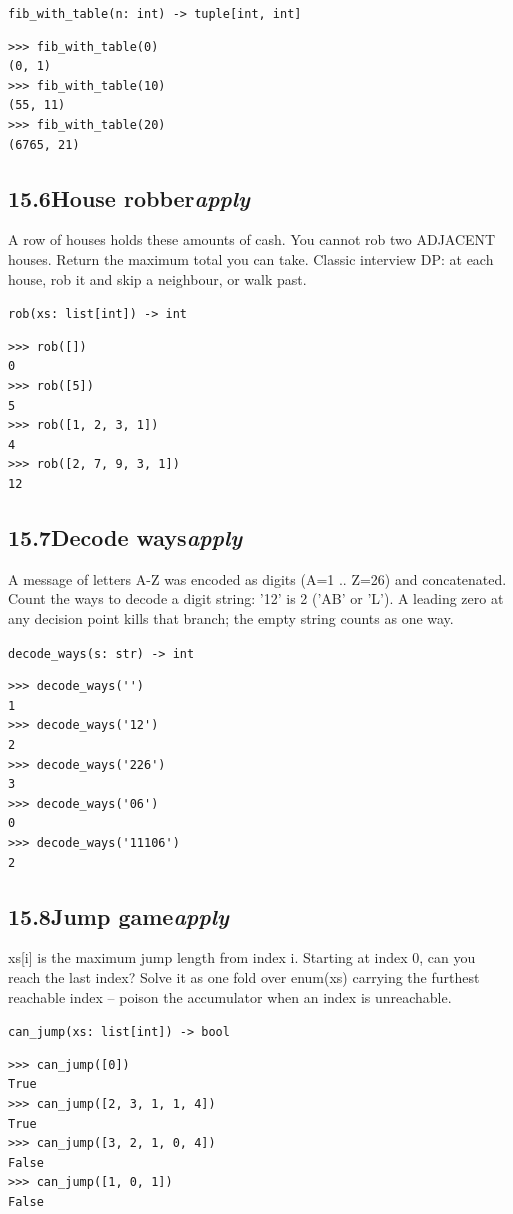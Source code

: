 \documentclass[10pt,letterpaper]{book}
\begin{document}
\noindent\texttt{fib\_with\_table(n: int) -> tuple[int, int]}
\begin{lstlisting}[style=ex]
>>> fib_with_table(0)
(0, 1)
>>> fib_with_table(10)
(55, 11)
>>> fib_with_table(20)
(6765, 21)
\end{lstlisting}
\subsection*{15.6\quad House robber\hfill\textnormal{\textit{apply}}}
A row of houses holds these amounts of cash. You cannot rob two ADJACENT houses. Return the maximum total you can take. Classic interview DP: at each house, rob it and skip a neighbour, or walk past.

\noindent\texttt{rob(xs: list[int]) -> int}
\begin{lstlisting}[style=ex]
>>> rob([])
0
>>> rob([5])
5
>>> rob([1, 2, 3, 1])
4
>>> rob([2, 7, 9, 3, 1])
12
\end{lstlisting}
\subsection*{15.7\quad Decode ways\hfill\textnormal{\textit{apply}}}
A message of letters A-Z was encoded as digits (A=1 .. Z=26) and concatenated. Count the ways to decode a digit string: '12' is 2 ('AB' or 'L'). A leading zero at any decision point kills that branch; the empty string counts as one way.

\noindent\texttt{decode\_ways(s: str) -> int}
\begin{lstlisting}[style=ex]
>>> decode_ways('')
1
>>> decode_ways('12')
2
>>> decode_ways('226')
3
>>> decode_ways('06')
0
>>> decode_ways('11106')
2
\end{lstlisting}
\subsection*{15.8\quad Jump game\hfill\textnormal{\textit{apply}}}
xs[i] is the maximum jump length from index i. Starting at index 0, can you reach the last index? Solve it as one fold over enum(xs) carrying the furthest reachable index -- poison the accumulator when an index is unreachable.

\noindent\texttt{can\_jump(xs: list[int]) -> bool}
\begin{lstlisting}[style=ex]
>>> can_jump([0])
True
>>> can_jump([2, 3, 1, 1, 4])
True
>>> can_jump([3, 2, 1, 0, 4])
False
>>> can_jump([1, 0, 1])
False
\end{lstlisting}
\end{document}
